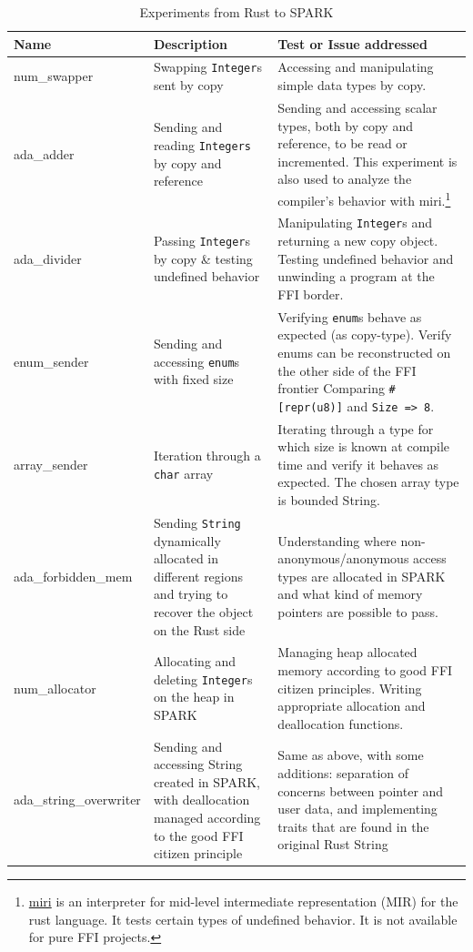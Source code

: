 \documentclass[nomenclature, english, bibtex]{kththesis}
\begin{document}
\begin{table}[ht!]
\footnotesize
\centering
\caption{Experiments from Rust to SPARK}
\label{tab:fromrusttospark}
\begin{tabular}{ |p{3cm}|p{4cm}|p{7cm}| }
\hline
\rowcolor{color1bg_fill}
\hline
\rowcolor{color2bg_fill}
\centering Name & \centering Description & \centering Test or Issue addressed \tabularnewline
\hline
num\_swapper & Swapping \texttt{Integer}s sent by copy & Accessing and manipulating simple data types by copy. \tabularnewline
\hline
ada\_adder & Sending and reading \texttt{Integers} by copy and reference & Sending and accessing scalar types, both by copy and reference, to be read or incremented. This experiment is also used to analyze the compiler's behavior with miri.\footnote{\href{https://github.com/rust-lang/miri/}{miri} is an interpreter for mid-level intermediate representation (MIR) for the rust language. It tests certain types of undefined behavior. It is not available for pure FFI projects.} \tabularnewline
\hline
ada\_divider & Passing \texttt{Integer}s by copy \& testing undefined behavior & Manipulating \texttt{Integer}s and returning a new copy object. \newline Testing undefined behavior and unwinding a program at the FFI border. \tabularnewline
\hline
enum\_sender & Sending and accessing \texttt{enum}s with fixed size & Verifying \texttt{enum}s behave as expected (as \gls{copy-type}). \newline Verify enums can be reconstructed on the other side of the FFI frontier \newline Comparing \texttt{\#[repr(u8)]} and \texttt{Size => 8}. \tabularnewline
\hline
array\_sender & Iteration through a \texttt{char} array & Iterating through a type for which size is known at compile time and verify it behaves as expected. The chosen array type is bounded String. \tabularnewline
\hline
ada\_forbidden\_mem & Sending \texttt{String} dynamically allocated in different regions and trying to recover the object on the Rust side & Understanding where non-anonymous/anonymous access types are allocated in SPARK and what kind of memory pointers are possible to pass.\tabularnewline
\hline
num\_allocator & Allocating and deleting \texttt{Integer}s on the heap in SPARK & Managing heap allocated memory according to good FFI citizen principles. Writing appropriate allocation and deallocation functions. \tabularnewline
\hline
ada\_string\_overwriter & Sending and accessing String created in SPARK, with deallocation managed according to the good FFI citizen principle & Same as above, with some additions: separation of concerns between pointer and user data, and implementing traits that are found in the original Rust String \tabularnewline
\hline
\end{tabular}
\end{table}
\FloatBarrier
\end{document}
